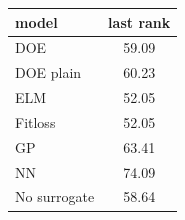 \begin{tabular}{|lc|}
\hline
model & last rank\\
\hline
DOE & 59.09 \\
DOE plain & 60.23 \\
ELM & 52.05 \\
Fitloss & 52.05 \\
GP & 63.41 \\
NN & 74.09 \\
No surrogate & 58.64 \\
\hline
\end{tabular}

